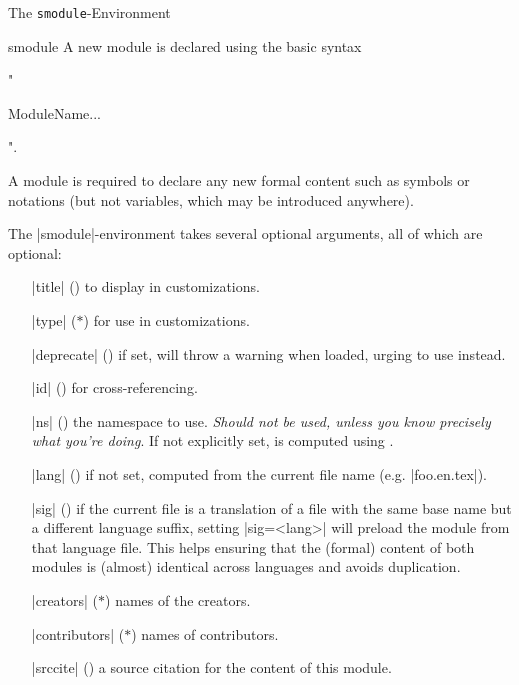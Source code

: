 \begin{sfragment}{The \texttt{smodule}-Environment}
    \begin{environment}{smodule}
        A new module is declared using the basic syntax
        \begin{center}
        \stexcode"\begin{smodule}[options]{ModuleName}...\end{smodule}".
        \end{center}
        A module is required to declare any new formal content such as
        symbols or notations (but not variables, which may be introduced
        anywhere).

        The |smodule|-environment takes several optional arguments,
        all of which are optional:

        \begin{itemize}
            \item[|title|] () to display in customizations.
            \item[|type|] ($\ast$)  for use in customizations.
            \item[|deprecate|] () if set, will throw a warning
            when loaded, urging to use  instead.
            \item[|id|] () for cross-referencing.
            \item[|ns|] () the namespace to use. \emph{Should not be used,
            unless you know precisely what you're doing}. If not explicitly set, is
            computed using .
            \item[|lang|] () if not set, computed from the current file name (e.g. |foo.en.tex|).
            \item[|sig|] () if the current file is a translation of a file with the same base name
            but a different language suffix, setting |sig=<lang>| will preload the module
            from that language file. This helps ensuring that the (formal) content of both modules
            is (almost) identical across languages and avoids duplication.
            \item[|creators|] ($\ast$) names of the creators.
            \item[|contributors|] ($\ast$) names of contributors.
            \item[|srccite|] () a source citation for the content of this module.
        \end{itemize}
    \end{environment}


\end{sfragment}
